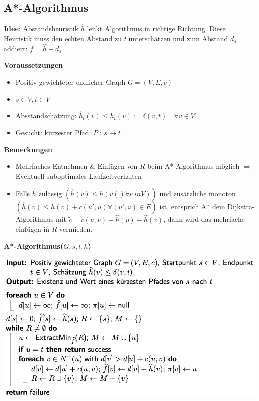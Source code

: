 \begin{sectionbox}
\subsection{A*-Algorithmus}
\textbf{Idee}: Abstandsheuristik $\hat{h}$ lenkt Algorithmus in richtige Richtung. Diese Heuristik muss den echten Abstand zu $t$ unterschätzen und zum
Abstand $d_s$ addiert: $f = \hat{h} + d_s$


\textbf{Voraussetzungen}
\begin{itemize}
    \item Positiv gewichteter endlicher Graph $G = (V, E, c)$
    \item $s \in V, t \in V$
    \item Absstandschätzung: $\hat{h}_t(v) \leq h_t(v) := \delta(v,t) \quad \forall v \in V$
    \item Gesucht: kürzester Pfad: $P \: : \: s \rightarrow t$
\end{itemize}

\textbf{Bemerkungen}
\begin{itemize}
    \item Mehrfaches Entnehmen \& Einfügen von $R$ beim A*-Algorithmus möglich $\Rightarrow$ Eventuell suboptimales Laufzeitverhalten
    \item Falls $\hat{h}$ zulässig $\left( \hat{h}(v) \leq h(v() \forall v \ in V)\right)$ und zusätzliche monoton $\left( \hat{h}(v) \leq h(v) + c(u',u) \forall (u',u) \in E \right)$ ist, entsprich A* dem Dijkstra-Algorithmus mit $\tilde{c} = c(u,v) + \hat{h}(u) - \hat{h}(v)$, dann wird das mehrfache einfügen in $R$ vermieden.
\end{itemize}

\textbf{A*-Algorithmus($G, s, t, \hat{h}$)}
\begin{center}
    \includegraphics[width=\columnwidth]{img/AStar.png}
\end{center}

\end{sectionbox}
